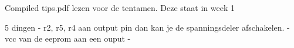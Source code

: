 Compiled tips.pdf lezen voor de tentamen. Deze staat in week 1


5 dingen
- r2, r5, r4 aan output pin dan kan je de spanningsdeler afschakelen.
- vcc van de eeprom aan een ouput 
- 